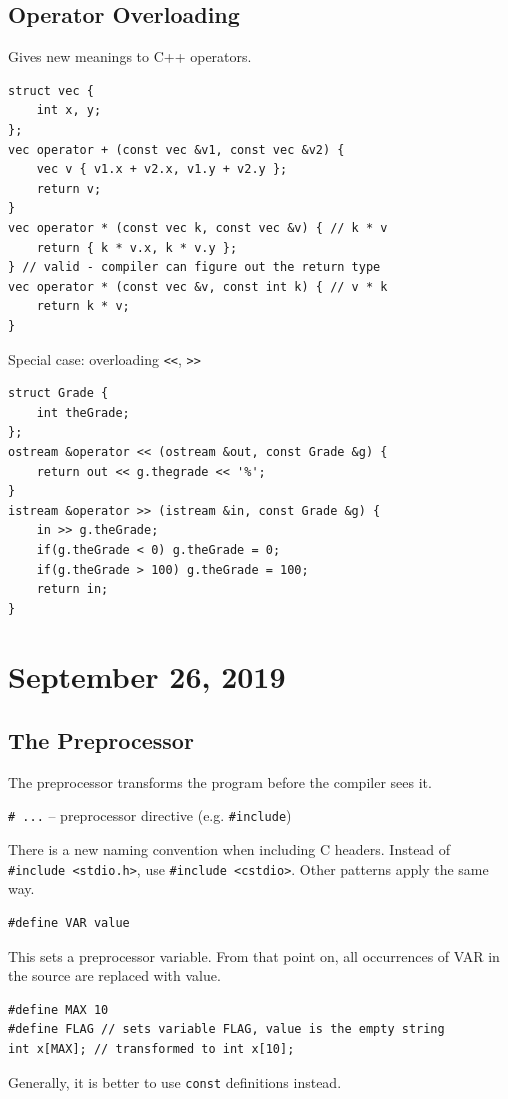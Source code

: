 \documentclass[11pt]{article}
\theoremstyle{definition}
\begin{document}
\subsection{Operator Overloading}
Gives new meanings to C++ operators.
\begin{lstlisting}
struct vec {
    int x, y;
};
vec operator + (const vec &v1, const vec &v2) {
    vec v { v1.x + v2.x, v1.y + v2.y };
    return v;
}
vec operator * (const vec k, const vec &v) { // k * v
    return { k * v.x, k * v.y }; 
} // valid - compiler can figure out the return type
vec operator * (const vec &v, const int k) { // v * k
    return k * v;
}
\end{lstlisting}
Special case: overloading {\tt <\null<}, {\tt >\null>}
\begin{lstlisting}
struct Grade {
    int theGrade;
};
ostream &operator << (ostream &out, const Grade &g) {
    return out << g.thegrade << '%';
}
istream &operator >> (istream &in, const Grade &g) {
    in >> g.theGrade;
    if(g.theGrade < 0) g.theGrade = 0;
    if(g.theGrade > 100) g.theGrade = 100;
    return in;
}
\end{lstlisting}
\newpage
\section{September 26, 2019}

\subsection{The Preprocessor}
The preprocessor transforms the program before the compiler sees it. 

{\tt \# ...} -- preprocessor directive (e.g. {\tt \#include})

There is a new naming convention when including C headers. Instead of {\tt \#include <stdio.h>}, use {\tt \#include <cstdio>}. Other patterns apply the same way.

\begin{lstlisting}
#define VAR value
\end{lstlisting}
This sets a preprocessor variable. From that point on, all occurrences of VAR in the source are replaced with value.
\begin{lstlisting}
#define MAX 10
#define FLAG // sets variable FLAG, value is the empty string
int x[MAX]; // transformed to int x[10];
\end{lstlisting}
Generally, it is better to use {\tt const} definitions instead.
\end{document}
